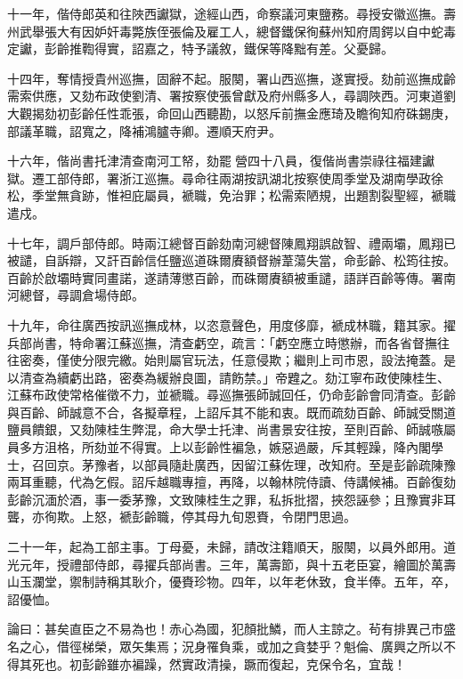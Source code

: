 \begin{pinyinscope}
十一年，偕侍郎英和往陜西讞獄，途經山西，命察議河東鹽務。尋授安徽巡撫。壽州武舉張大有因妒奸毒斃族侄張倫及雇工人，總督鐵保徇蘇州知府周鍔以自中蛇毒定讞，彭齡推鞫得實，詔嘉之，特予議敘，鐵保等降黜有差。父憂歸。

十四年，奪情授貴州巡撫，固辭不起。服闋，署山西巡撫，遂實授。劾前巡撫成齡需索供應，又劾布政使劉清、署按察使張曾獻及府州縣多人，尋調陜西。河東道劉大觀揭劾初彭齡任性乖張，命回山西聽勘，以怒斥前撫金應琦及瞻徇知府硃錫庚，部議革職，詔寬之，降補鴻臚寺卿。遷順天府尹。

十六年，偕尚書托津清查南河工帑，劾罷營四十八員，復偕尚書崇祿往福建讞獄。遷工部侍郎，署浙江巡撫。尋命往兩湖按訊湖北按察使周季堂及湖南學政徐松，季堂無貪跡，惟袒庇屬員，褫職，免治罪；松需索陋規，出題割裂聖經，褫職遣戍。

十七年，調戶部侍郎。時兩江總督百齡劾南河總督陳鳳翔誤啟智、禮兩壩，鳳翔已被譴，自訴辯，又訐百齡信任鹽巡道硃爾賡額督辦葦蕩失當，命彭齡、松筠往按。百齡於啟壩時實同畫諾，遂請薄懲百齡，而硃爾賡額被重譴，語詳百齡等傳。署南河總督，尋調倉場侍郎。

十九年，命往廣西按訊巡撫成林，以恣意聲色，用度侈靡，褫成林職，籍其家。擢兵部尚書，特命署江蘇巡撫，清查虧空，疏言：「虧空應立時懲辦，而各省督撫往往密奏，僅使分限完繳。始則屬官玩法，任意侵欺；繼則上司市恩，設法掩蓋。是以清查為續虧出路，密奏為緩辦良圖，請飭禁。」帝韙之。劾江寧布政使陳桂生、江蘇布政使常格催徵不力，並褫職。尋巡撫張師誠回任，仍命彭齡會同清查。彭齡與百齡、師誠意不合，各擬章程，上詔斥其不能和衷。既而疏劾百齡、師誠受關道鹽員饋銀，又劾陳桂生弊混，命大學士托津、尚書景安往按，至則百齡、師誠嗾屬員多方沮格，所劾並不得實。上以彭齡性褊急，嫉惡過嚴，斥其輕躁，降內閣學士，召回京。茅豫者，以部員隨赴廣西，因留江蘇佐理，改知府。至是彭齡疏陳豫兩耳重聽，代為乞假。詔斥越職專擅，再降，以翰林院侍讀、侍講候補。百齡復劾彭齡沉湎於酒，事一委茅豫，文致陳桂生之罪，私拆批摺，挾怨誣參；且豫實非耳聾，亦徇欺。上怒，褫彭齡職，停其母九旬恩賚，令閉門思過。

二十一年，起為工部主事。丁母憂，未歸，請改注籍順天，服闋，以員外郎用。道光元年，授禮部侍郎，尋擢兵部尚書。三年，萬壽節，與十五老臣宴，繪圖於萬壽山玉瀾堂，禦制詩稱其耿介，優賚珍物。四年，以年老休致，食半俸。五年，卒，詔優恤。

論曰：甚矣直臣之不易為也！赤心為國，犯顏批鱗，而人主諒之。茍有排異己市盛名之心，借徑梯榮，眾矢集焉；況身罹負乘，或加之貪婪乎？魁倫、廣興之所以不得其死也。初彭齡雖亦褊躁，然實政清操，蹶而復起，克保令名，宜哉！


\end{pinyinscope}